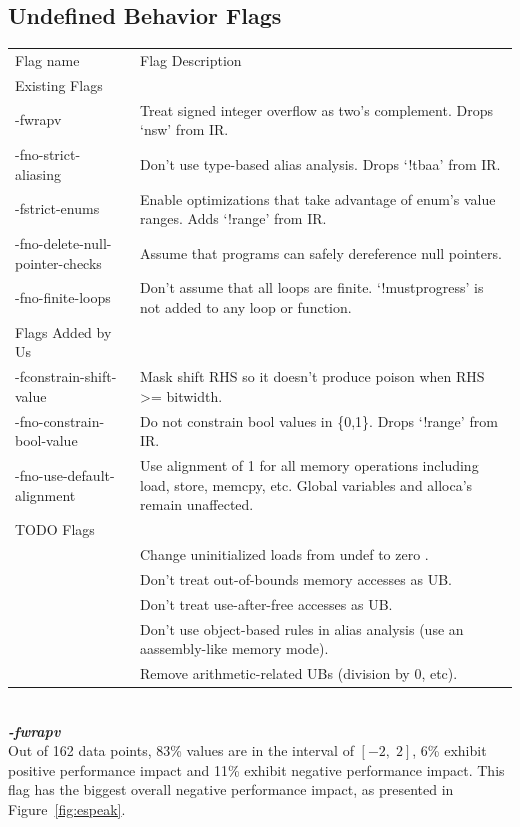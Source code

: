 \documentclass{sciposter}
\begin{document}
\begin{multicols}{3}
\section{Undefined Behavior Flags}

\begin{tabular}{p{8cm}|p{15cm}|}
\rowcolor{gray!50}
Flag name & Flag Description\\
Existing Flags & \\
-fwrapv & Treat signed integer overflow as two's complement. Drops `nsw' from IR.\\
-fno-strict-aliasing & Don't use type-based alias analysis. Drops `!tbaa' from IR. \\
-fstrict-enums & Enable optimizations that take advantage of enum's value ranges. Adds `!range' from IR.\\
-fno-delete-null-pointer-checks & Assume that programs can safely dereference null pointers. \\
-fno-finite-loops & Don’t assume that all loops are finite. `!mustprogress' is not added to any loop or function.\\
Flags Added by Us & \\
-fconstrain-shift-value & Mask shift RHS so it doesn't produce poison when RHS >= bitwidth. \\
-fno-constrain-bool-value & Do not constrain bool values in \{0,1\}. Drops `!range' from IR.\\
-fno-use-default-alignment & Use alignment of 1 for all memory operations including load, store, memcpy, etc. Global variables and alloca's remain unaffected.\\
TODO Flags & \\
& Change uninitialized loads from undef to zero . \\
& Don't treat out-of-bounds memory accesses as UB. \\
& Don't treat use-after-free accesses as UB.\\
& Don't use object-based rules in alias analysis (use an aassembly-like memory mode). \\
& Remove arithmetic-related UBs (division by 0, etc). \\
\end{tabular} \\

\textbf{\textit{-fwrapv}} \\
Out of 162 data points, 83\% values are in the interval of \( [-2,\;2] \), 
6\% exhibit positive performance impact and 11\% exhibit negative
performance impact. This flag has the biggest overall negative 
performance impact, as presented in Figure~\ref{fig:espeak}.


\end{multicols}
\end{document}
